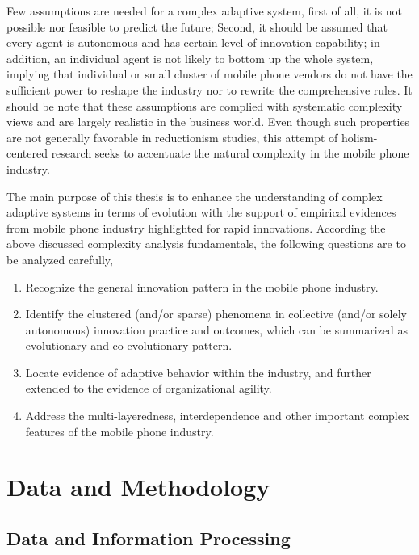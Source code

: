 \documentclass[utf8,english]{gradu3}
\begin{document}
Few assumptions are needed for a complex adaptive system, first of all, it is not possible nor feasible to predict the future; Second, it should be assumed that every agent is autonomous and has certain level of innovation capability; in addition, an individual agent is not likely to bottom up the whole system, implying that individual or small cluster of mobile phone vendors do not have the sufficient power to reshape the industry nor to rewrite the comprehensive rules. It should be note that these assumptions are complied with systematic complexity views and are largely realistic in the business world. Even though such properties are not generally favorable in reductionism studies, this attempt of holism-centered research seeks to accentuate the natural complexity in the mobile phone industry.

The main purpose of this thesis is to enhance the understanding of complex adaptive systems in terms of evolution with the support of empirical evidences from mobile phone industry highlighted for rapid innovations. According the above discussed complexity analysis fundamentals, the following questions are to be analyzed carefully,

\begin{enumerate}
    \item Recognize the general innovation pattern in the mobile phone industry.
    \item Identify the clustered (and/or sparse) phenomena in collective (and/or solely autonomous) innovation practice and outcomes, which can be summarized as evolutionary and co-evolutionary pattern.
    \item Locate evidence of adaptive behavior within the industry, and further extended to the evidence of organizational agility.
    \item Address the multi-layeredness, interdependence and other important complex features of the mobile phone industry.
\end{enumerate}

\chapter{Data and Methodology}

\section{Data and Information Processing}
\end{document}
